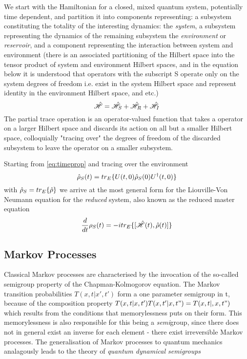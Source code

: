 We start with the Hamiltonian for a closed, mixed quantum system, potentially time dependent, and partition it into components representing: a subsystem constituting the totality of the interesting dynamics: the \emph{system}, a subsystem representing the dynamics of the remaining subsystem the \emph{environment} or \emph{reservoir}, and a component representing the interaction between system and environment (there is an associated partitioning of the Hilbert space into the tensor product of system and environment Hilbert spaces, and in the equation below it is understood that operators with the subscript S operate only on the system degrees of freedom i.e. exist in the system Hilbert space and represent identity in the environment Hilbert space, and etc.)
\begin{equation}
	\hat{\mathscr{H}} = \hat{\mathscr{H}}_S +\hat{\mathscr{H}}_R + \hat{\mathscr{H}}_I
\end{equation}
The partial trace operation is an operator-valued function that takes a operator on a larger Hilbert space and discards its action on all but a smaller Hilbert space, colloquially "tracing over" the degrees of freedom of the discarded subsystem to leave the operator on a smaller subsystem.

Starting from \cref{eq:timeprop} and tracing over the environment
\begin{equation}
	\hat{\rho}_S (t) = tr_E \{U(t, 0) \hat{\rho}_S (0) U^\dagger (t, 0) \}
\end{equation}
with $\hat{\rho}_S = tr_E\{\hat{\rho}\}$ we arrive at the most general form for the Liouville-Von Neumann equation for the \emph{reduced} system, also known as the reduced master equation
\begin{equation}
	\frac{d}{dt} \rho_S (t) = -itr_E\{[\hat{\mathscr{H}}(t), \hat{\rho}(t)]\}
\end{equation}
\subsection{Markov Processes}
Classical Markov processes are characterised by the invocation of the so-called semigroup property of the Chapman-Kolmogorov equation. The Markov transition probabilities $T(x, t|x', t')$ form a one parameter semigroup in t, because of the composition property $T(x, t|x, t')T(x, t'|x, t") = T(x, t|,x, t")$ which results from the conditions that memorylessness puts on their form. This memorylessness is also responsible for this being a \emph{semi}group, since there does not in general exist an inverse for each element - there exist irreversible Markov processes.
The generalisation of Markov processes to quantum mechanics analagously leads to the theory of \emph{quantum dynamical semigroups}

